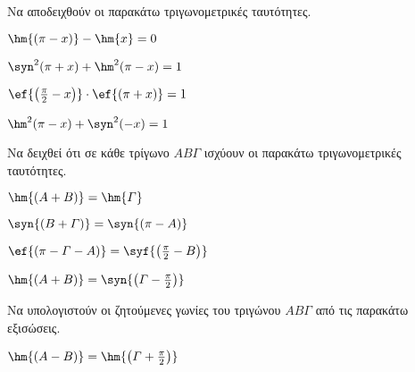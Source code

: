 \begin{multicols}{2}
\Askhsh
Να αποδειχθούν οι παρακάτω τριγωνομετρικές ταυτότητες.
\begin{rlist}
\item $ \hm{\left( \pi-x\right) }-\hm{x}=0 $
\item $ \syn^2{(\pi+x)}+\hm^2{(\pi-x)}=1 $
\item $ \ef{\left( \frac{\pi}{2}-x\right) }\cdot\ef{\left( \pi+x\right) }=1 $
\item $ \hm^2{(\pi-x)}+\syn^2{(-x)}=1 $
\end{rlist}
\end{multicols}
\begin{multicols}{2}
\Askhsh
Να δειχθεί ότι σε κάθε τρίγωνο $ AB\varGamma $ ισχύουν οι παρακάτω τριγωνομετρικές ταυτότητες.
\begin{rlist}
\item $ \hm{(A+B)}=\hm{\varGamma} $
\item $ \syn{(B+\varGamma)}=\syn{(\pi-A)} $
\item $ \ef{(\pi-\varGamma-A)}=\syf{\left(\frac{\pi}{2}-B\right) } $
\item $ \hm{(A+B)}=\syn{\left(\varGamma-\frac{\pi}{2}\right) } $
\end{rlist}
\Askhsh
Να υπολογιστούν οι ζητούμενες γωνίες του τριγώνου $ AB\varGamma $ από τις παρακάτω εξισώσεις.
\begin{rlist}
\item $ \hm{(A-B)}=\hm{\left(\varGamma+\frac{\pi}{2} \right) } $
\end{rlist}
\end{multicols}
